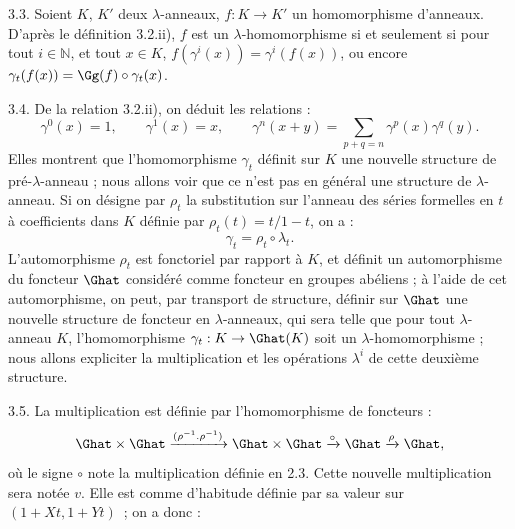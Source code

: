 
3.3.
Soient \(K\), \(K'\) deux \(\lambda\)-anneaux, \(f:K\to K'\) un homomorphisme d'anneaux. D'après le définition 3.2.ii), \(f\) est un \(\lambda\)-homomorphisme si et seulement si pour tout \(i\in\mathbb N\), et tout \(x\in K\), \(f(\gamma^i(x))=\gamma^i(f(x))\), ou encore \(\gamma_t(f(x))=\Gg(f)\circ\gamma_t(x)\).

3.4. De la relation 3.2.ii), on déduit les relations :
\begin{equation}\tag{3.4.1}
  \gamma^0(x)=1,
  \qquad \gamma^1(x)=x,
  \qquad \gamma^n(x+y)=\sum_{p+q=n}\gamma^p(x)\gamma^q(y).
\end{equation}
Elles montrent que l'homomorphisme \(\gamma_t\) définit sur \(K\) une nouvelle structure de pré-\(\lambda\)-anneau ; nous allons voir que ce n'est pas en général une structure de \(\lambda\)-anneau. Si on désigne par \(\rho_t\) la substitution sur l'anneau des séries formelles en \(t\) à coefficients dans \(K\) définie par \(\rho_t(t)=t/1-t\), on a :
\[
  \gamma_t=\rho_t\circ\lambda_t.
\]
L'automorphisme \(\rho_t\) est fonctoriel par rapport à \(K\), et définit un automorphisme du foncteur \(\Ghat\) considéré comme foncteur en groupes abéliens ; à l'aide de cet automorphisme, on peut, par transport de structure, définir sur \(\Ghat\) une nouvelle structure de foncteur en \(\lambda\)-anneaux, qui sera telle que pour tout \(\lambda\)-anneau \(K\), l'homomorphisme \(\gamma_t:K\to\Ghat(K)\) soit un \(\lambda\)-homomorphisme ; nous allons expliciter la multiplication et les opérations \(\lambda^i\) de cette deuxième structure.

3.5. La multiplication est définie par l'homomorphisme de foncteurs :
\[
  \Ghat\times\Ghat\xrightarrow{(\rho^{-1}.\rho^{-1})}
  \Ghat\times\Ghat\xrightarrow{\circ}\Ghat\xrightarrow{\rho}\Ghat ,
\]
où le signe \(\circ\) note la multiplication définie en 2.3. Cette nouvelle multiplication sera notée \(v\). Elle est comme d'habitude définie par sa valeur sur \((1+Xt,1+Yt)\)~; on a donc :
